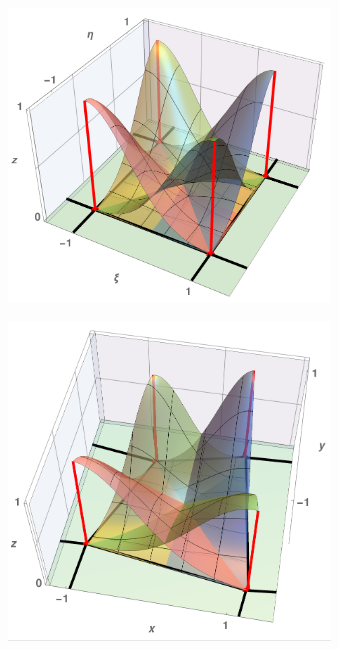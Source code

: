 \begin{figure}[ht]
    \begin{subfigure}[b]{0.48\textwidth}
        \centering
        \includegraphics[width=0.94\textwidth]{Slike/undeformedShapeFs.png}
        \vspace{6mm}
        \caption{}
    \end{subfigure}
    \begin{subfigure}[b]{0.48\textwidth}
        \centering
        \includegraphics[width=0.94\textwidth]{Slike/deformedShapeFs.png}
        \caption{}
    \end{subfigure}
    \caption{}
    \label{fig:shapeFs}
\end{figure}

